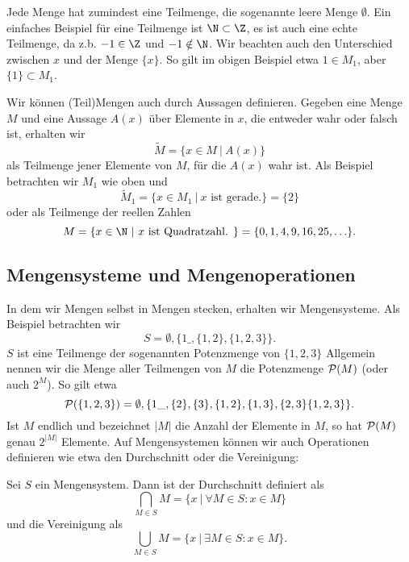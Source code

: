 \documentclass[letterpaper,10pt,english]{jupyterBook}
\begin{document}
Jede Menge hat zumindest eine Teilmenge, die sogenannte leere Menge \(\emptyset\). Ein einfaches Beispiel für eine Teilmenge ist \(\N \subset \Z\), es ist auch eine echte Teilmenge, da z.b. \(-1 \in \Z\) und \(-1 \notin \N\).
Wir beachten auch den Unterschied zwischen \(x\) und der Menge \(\{x\}\). So gilt im obigen Beispiel etwa \(1 \in M_1\), aber \(\{1\} \subset M_1\).

Wir können (Teil)Mengen auch durch Aussagen definieren. Gegeben eine Menge \(M\) und eine Aussage \(A(x)\) über Elemente in \(x\), die entweder wahr oder falsch ist, erhalten wir
\begin{equation*}
 \tilde M = \{ x\in M ~|~A(x)\}
\end{equation*}
als Teilmenge jener Elemente von \(M\), für die \(A(x)\) wahr ist. Als Beispiel betrachten wir \(M_1\) wie oben und
\begin{equation*}
 \tilde M_1 = \{x \in M_1 ~|~x \text{ ist gerade.}\} = \{2\}
\end{equation*}
oder als Teilmenge der reellen Zahlen
\begin{equation*}
 M = \{ x \in \N~|~x \text{ ist Quadratzahl. }\} = \{0,1,4,9,16,25,\ldots\}.
\end{equation*}

\subsection{Mengensysteme und Mengenoperationen}
\label{\detokenize{grundlagen/mengenlogik:mengensysteme-und-mengenoperationen}}
In dem wir Mengen selbst in Mengen stecken, erhalten wir Mengensysteme. Als Beispiel betrachten wir
\begin{equation*}
 S = \emptyset,\{1\_,\{1,2\},\{1,2,3\} \}.
\end{equation*}
\(S\) ist eine Teilmenge der sogenannten Potenzmenge von \(\{1,2,3\}\) Allgemein nennen wir die Menge aller Teilmengen von \(M\) die Potenzmenge \({\cal P}(M)\) (oder auch \(2^M\)). So gilt etwa
\begin{equation*}
 {\cal P}(\{1,2,3\}) = \emptyset,\{1\_,\{2\},\{3\},\{1,2\},\{1,3\},\{2,3\}\{1,2,3\} \}.
\end{equation*}
Ist \(M\) endlich und bezeichnet \(\vert M \vert\) die Anzahl der Elemente in \(M\), so hat \({\cal P}(M)\) genau \(2^{\vert M \vert}\) Elemente.
Auf Mengensystemen können wir auch Operationen definieren wie etwa den Durchschnitt oder die Vereinigung:
\label{grundlagen/mengenlogik:definition-1}
\begin{definition}{}{}



Sei \(S\) ein Mengensystem. Dann ist der Durchschnitt definiert als
\begin{equation*}
 \bigcap_{M \in S} M = \{x ~|~ \forall M \in S: x \in M \}
\end{equation*}
und die Vereinigung als
\begin{equation*}
 \bigcup_{M \in S} M = \{x ~|~ \exists M \in S: x \in M \}.
\end{equation*}\end{definition}
\end{document}
